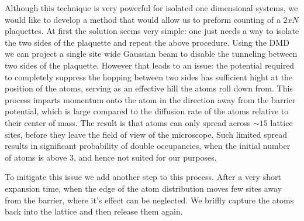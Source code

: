  Although this technique is very powerful for isolated one dimensional systems, we would like to develop a method that would allow us to preform counting of a $2xN$ plaquettes. At first the solution seems very simple: one just needs a way to isolate the two sides of the plaquette and repeat the above procedure. Using the DMD we can project a single site wide Gaussian beam to disable the tunneling between two sides of the plaquette. However that leads to an issue: the potential required to completely suppress the hopping between two sides has sufficient hight at the position of the atoms, serving as an effective hill the atoms roll down from. This process imparts momentum onto the atom in the direction away from the barrier potential, which is large compared to the diffusion rate of the atoms relative to their center of mass. The result is that atoms can only spread across $\sim 15$ lattice sites, before they leave the field of view of the microscope. Such limited spread results in significant probability of double occupancies, when the initial number of atoms is above $3$, and hence not suited for our purposes.
 
 To mitigate this issue we add another step to this process. After a very short expansion time, when the edge of the atom distribution moves few sites away from the barrier, where it's effect can be neglected. We briffly capture the atoms back into the lattice and then release them again.